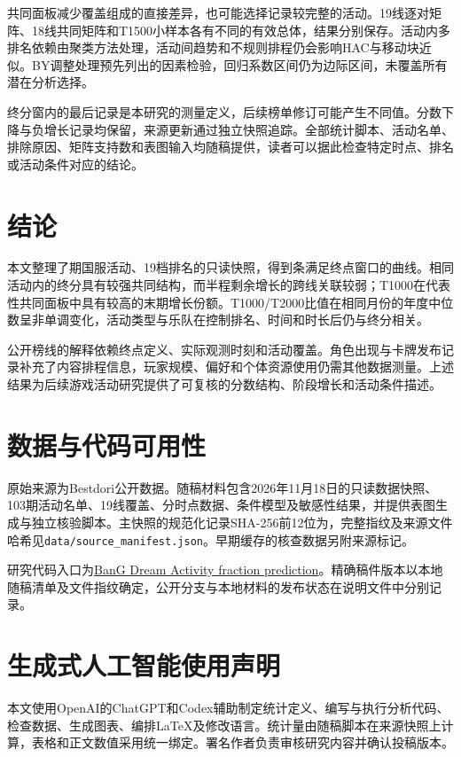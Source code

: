 \documentclass[preprint,12pt]{elsarticle}
\begin{document}
共同面板减少覆盖组成的直接差异，也可能选择记录较完整的活动。19线逐对矩阵、18线共同矩阵和T1500小样本各有不同的有效总体，结果分别保存。活动内多排名依赖由聚类方法处理，活动间趋势和不规则排程仍会影响HAC与移动块近似。BY调整处理预先列出的因素检验，回归系数区间仍为边际区间，未覆盖所有潜在分析选择。

终分窗内的最后记录是本研究的测量定义，后续榜单修订可能产生不同值。分数下降与负增长记录均保留，来源更新通过独立快照追踪。全部统计脚本、活动名单、排除原因、矩阵支持数和表图输入均随稿提供，读者可以据此检查特定时点、排名或活动条件对应的结论。

\section{结论}

本文整理了\NumEvents{}期国服活动、19档排名的只读快照，得到\NumValidCurves{}条满足终点窗口的曲线。相同活动内的终分具有较强共同结构，而半程剩余增长的跨线关联较弱；T1000在代表性共同面板中具有较高的末期增长份额。T1000/T2000比值在相同月份的年度中位数呈非单调变化，活动类型与乐队在控制排名、时间和时长后仍与终分相关。

公开榜线的解释依赖终点定义、实际观测时刻和活动覆盖。角色出现与卡牌发布记录补充了内容排程信息，玩家规模、偏好和个体资源使用仍需其他数据测量。上述结果为后续游戏活动研究提供了可复核的分数结构、阶段增长和活动条件描述。

\FloatBarrier
\section*{数据与代码可用性}

原始来源为Bestdori公开数据\citep{bestdori2026}。随稿材料包含2026年11月18日的只读数据快照、103期活动名单、19线覆盖、分时点数据、条件模型及敏感性结果，并提供表图生成与独立核验脚本。主快照的规范化记录SHA-256前12位为\texttt{\SourceFingerprint{}}，完整指纹及来源文件哈希见\texttt{data/source\_manifest.json}。早期缓存的核查数据另附来源标记。

研究代码入口为\href{https://github.com/AhsokaTano26/BanG-DreamActivity-fraction-prediction/tree/research/innovation-20261113}{BanG Dream Activity fraction prediction}。精确稿件版本以本地随稿清单及文件指纹确定，公开分支与本地材料的发布状态在说明文件中分别记录。

\section*{生成式人工智能使用声明}

本文使用OpenAI的ChatGPT和Codex辅助制定统计定义、编写与执行分析代码、检查数据、生成图表、编排LaTeX及修改语言。统计量由随稿脚本在来源快照上计算，表格和正文数值采用统一绑定。署名作者负责审核研究内容并确认投稿版本。

\begingroup\raggedright\small


\endgroup
\end{document}
